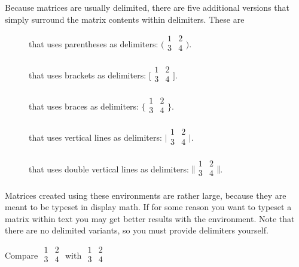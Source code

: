 Because matrices are usually delimited, there are five additional versions that
simply surround the matrix contents within delimiters. These are
\begin{description}
  \item[] that uses parentheses as delimiters:
    \(\bigl(
    \begin{smallmatrix}
      1 & 2 \\
      3 & 4 \\
    \end{smallmatrix}
    \bigr)\).
  \item[] that uses brackets as delimiters:
    \(\bigl[
      \begin{smallmatrix}
        1 & 2 \\
        3 & 4 \\
      \end{smallmatrix}
      \bigr]\).
  \item[] that uses braces as delimiters:
    \(\bigl\{
    \begin{smallmatrix}
      1 & 2 \\
      3 & 4 \\
    \end{smallmatrix}
    \bigr\}\).
  \item[] that uses vertical lines as delimiters:
    \(\bigl\vert
    \begin{smallmatrix}
      1 & 2 \\
      3 & 4 \\
    \end{smallmatrix}
    \bigr\vert\).
  \item[] that uses double vertical lines as delimiters:
    \(\bigl\Vert
    \begin{smallmatrix}
      1 & 2 \\
      3 & 4 \\
    \end{smallmatrix}
    \bigr\Vert\).
\end{description}

Matrices created using these environments are rather large, because they are
meant to be typeset in display math. If for some reason you want to typeset a
matrix within text you may get better results with the 
environment. Note that there are no delimited variants, so you must
provide delimiters yourself.
\begin{example}
Compare \(
  \begin{matrix}
    1 & 2 \\
    3 & 4 \\
  \end{matrix}
\) with \(
  \begin{smallmatrix}
    1 & 2 \\
    3 & 4 \\
  \end{smallmatrix}
\)
\end{example}

